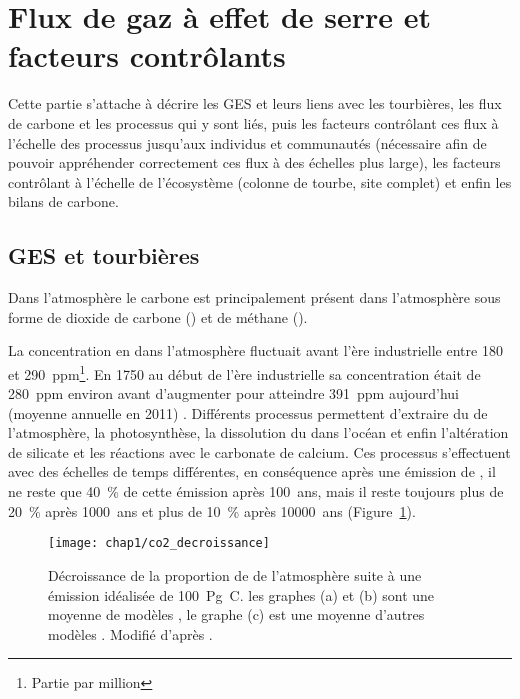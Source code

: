 
\section{Flux de gaz à effet de serre et facteurs contrôlants}

Cette partie s'attache à décrire les GES et leurs liens avec les tourbières, les flux de carbone et les processus qui y sont liés, puis les facteurs contrôlant ces flux à l'échelle des processus jusqu'aux individus et communautés (nécessaire afin de pouvoir appréhender correctement ces flux à des échelles plus large), les facteurs contrôlant à l'échelle de l'écosystème (colonne de tourbe, site complet) et enfin les bilans de carbone.


\subsection{GES et tourbières}

Dans l'atmosphère le carbone est principalement présent dans l'atmosphère sous forme de dioxide de carbone (\coo) et de méthane (\chh).

La concentration en \coo dans l'atmosphère fluctuait avant l'ère industrielle entre 180 et \SI{290}{ppm}\footnote{Partie par million}.
En 1750 au début de l'ère industrielle sa concentration était de \SI{280}{ppm} environ avant d'augmenter pour atteindre \SI{391}{ppm} aujourd'hui (moyenne annuelle en 2011) \citep{Ciais2014}.
Différents processus permettent d'extraire du \coo de l'atmosphère, la photosynthèse, la dissolution du \coo dans l'océan et enfin l'altération de silicate et les réactions avec le carbonate de calcium.
Ces processus s'effectuent avec des échelles de temps différentes, en conséquence après une émission de \coo, il ne reste que \SI{40}{\percent} de cette émission après \SI{100}{ans}, mais il reste toujours plus de \SI{20}{\percent} après \SI{1000}{ans} et plus de \SI{10}{\percent} après \SI{10000}{ans} \citep{joos2013,Ciais2014} (Figure~\ref{fig:co2_decroissance}).

\begin{figure}
\centering
\texttt{[image: chap1/co2\_decroissance]}
\caption{Décroissance de la proportion de \coo de l'atmosphère suite à une émission idéalisée de \SI{100}{\peta\gram C}. les graphes (a) et (b) sont une moyenne de modèles \citep{joos2013}, le graphe (c) est une moyenne d'autres modèles \citep{archer2009}. Modifié d'après \citep{Ciais2014}.}
\label{fig:co2_decroissance}
\end{figure}


